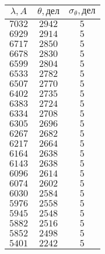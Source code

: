 \begin{tabular}{| c | c | c |}
  \hline
  $\lambda, A$ & $\theta, дел$ & $\sigma_{\theta}, дел$ \\
  \hline
  $7032$       & $2942$        & $5$                    \\
  \hline
  $6929$       & $2914$        & $5$                    \\
  \hline
  $6717$       & $2850$        & $5$                    \\
  \hline
  $6678$       & $2830$        & $5$                    \\
  \hline
  $6599$       & $2804$        & $5$                    \\
  \hline
  $6533$       & $2782$        & $5$                    \\
  \hline
  $6507$       & $2770$        & $5$                    \\
  \hline
  $6402$       & $2735$        & $5$                    \\
  \hline
  $6383$       & $2724$        & $5$                    \\
  \hline
  $6334$       & $2708$        & $5$                    \\
  \hline
  $6305$       & $2696$        & $5$                    \\
  \hline
  $6267$       & $2682$        & $5$                    \\
  \hline
  $6217$       & $2664$        & $5$                    \\
  \hline
  $6164$       & $2638$        & $5$                    \\
  \hline
  $6143$       & $2638$        & $5$                    \\
  \hline
  $6096$       & $2614$        & $5$                    \\
  \hline
  $6074$       & $2602$        & $5$                    \\
  \hline
  $6030$       & $2584$        & $5$                    \\
  \hline
  $5976$       & $2558$        & $5$                    \\
  \hline
  $5945$       & $2548$        & $5$                    \\
  \hline
  $5882$       & $2516$        & $5$                    \\
  \hline
  $5852$       & $2498$        & $5$                    \\
  \hline
  $5401$       & $2242$        & $5$                    \\
  \hline
\end{tabular}